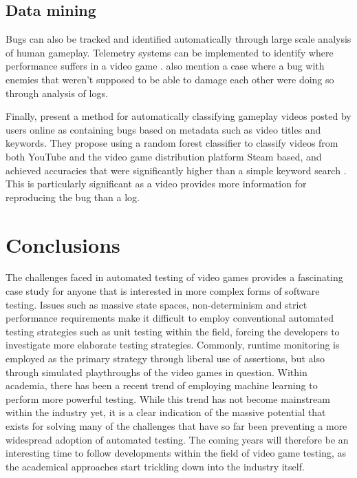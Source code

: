\documentclass{article}
\begin{document}
    \subsection{Data mining}
    Bugs can also be tracked and identified automatically through large scale analysis of human gameplay. Telemetry systems can be implemented to identify where performance suffers in a video game \parencite{drachen2013game}. \textcite{drachen2013game} also mention a case where a bug with enemies that weren't supposed to be able to damage each other were doing so through analysis of logs.

    Finally, \textcite{lin2019identifying} present a method for automatically classifying gameplay videos posted by users online as containing bugs based on metadata such as video titles and keywords. They propose using a random forest classifier to classify videos from both YouTube and the video game distribution platform Steam based, and achieved accuracies that were significantly higher than a simple keyword search \parencite{lin2019identifying}. This is particularly significant as a video provides more information for reproducing the bug than a log. 

    \section{Conclusions}
    The challenges faced in automated testing of video games provides a fascinating case study for anyone that is interested in more complex forms of software testing. Issues such as massive state spaces, non-determinism and strict performance requirements make it difficult to employ conventional automated testing strategies such as unit testing within the field, forcing the developers to investigate more elaborate testing strategies. Commonly, runtime monitoring is employed as the primary strategy through liberal use of assertions, but also through simulated playthroughs of the video games in question. Within academia, there has been a recent trend of employing machine learning to perform more powerful testing. While this trend has not become mainstream within the industry yet, it is a clear indication of the massive potential that exists for solving many of the challenges that have so far been preventing a more widespread adoption of automated testing. The coming years will therefore be an interesting time to follow developments within the field of video game testing, as the academical approaches start trickling down into the industry itself.

    \printbibliography
\end{document}
